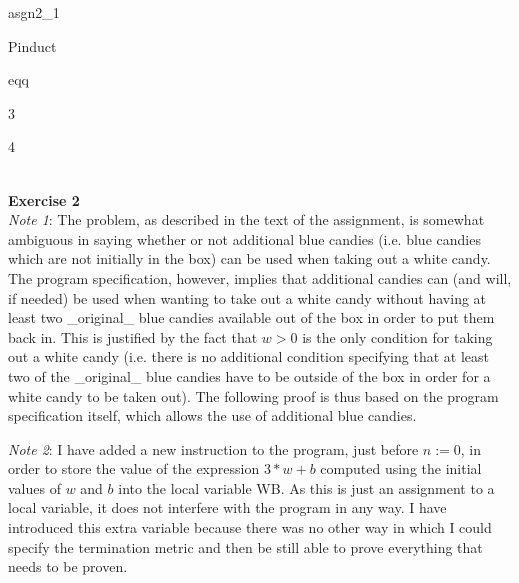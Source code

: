 \documentclass[fleqn,oneside]{article}
\begin{document}
\begin{PROOF}{asgn2\_1}
\begin{BODY}
\begin{PROOF}{Pinduct}
\begin{BODY}
\begin{EQPROOF}{eqq}
\item[] 

\end{EQPROOF}

\end{BODY}

\end{PROOF}

\item[3] 


\item[4] 


\end{BODY}

\end{PROOF}

\ \\

\textbf{Exercise 2}\\

\textnormal{\emph{Note 1}: The problem, as described in the text of the assignment, is somewhat
ambiguous in saying whether or not additional blue candies (i.e. blue candies which are not
initially in the box) can be used when taking out a white candy. The program specification,
however, implies that additional candies can (and will, if needed) be used when wanting to take
out a white candy without having at least two \_original\_ blue candies available out of the
box in order to put them back in. This is justified by the fact that $w>0$ is the only condition
for taking out a white candy (i.e. there is no additional condition specifying that at least two
of the \_original\_ blue candies have to be outside of the box in order for a white candy to be
taken out). The following proof is thus based on the program specification itself, which allows
the use of additional blue candies.}

\textnormal{\emph{Note 2}: I have added a new instruction to the program, just before $n:=0$,
in order to store the value of the expression $3*w+b$ computed using the initial values of $w$
and $b$ into the local variable WB. As this is just an assignment to a local variable, it
does not interfere with the program in any way. I have introduced this extra variable because
there was no other way in which I could specify the termination metric and then be still able
to prove everything that needs to be proven.}\\
\end{document}
